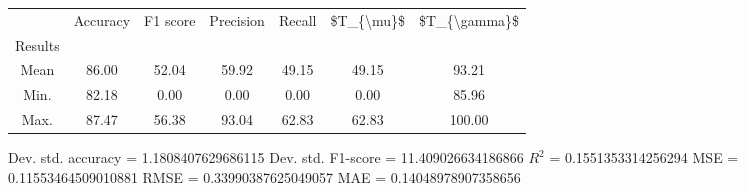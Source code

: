 \begin{tabular}{|c|c|c|c|c|c|c|}
\toprule
{} &  Accuracy &  F1 score &  Precision &  Recall &  \$T\_\{\textbackslash mu\}\$ &  \$T\_\{\textbackslash gamma\}\$ \\
Results &           &           &            &         &            &               \\
\hline
Mean    &     86.00 &     52.04 &      59.92 &   49.15 &      49.15 &         93.21 \\
Min.    &     82.18 &      0.00 &       0.00 &    0.00 &       0.00 &         85.96 \\
Max.    &     87.47 &     56.38 &      93.04 &   62.83 &      62.83 &        100.00 \\
\bottomrule
\end{tabular}

 Dev. std. accuracy = 1.1808407629686115
 Dev. std. F1-score = 11.409026634186866
 $R^2$ = 0.1551353314256294
 MSE = 0.11553464509010881
 RMSE = 0.33990387625049057
 MAE = 0.14048978907358656